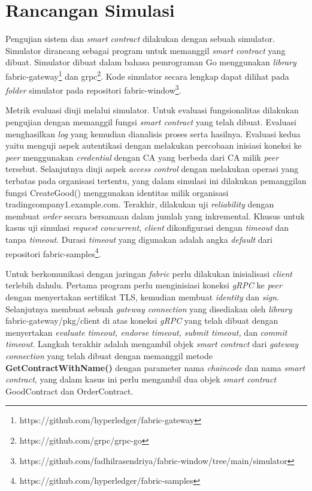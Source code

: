 \section{Rancangan Simulasi}
\label{sec:simulation}
Pengujian sistem dan \textit{smart contract} dilakukan dengan sebuah simulator. Simulator dirancang sebagai program untuk memanggil \textit{smart contract} yang dibuat. Simulator dibuat dalam bahasa pemrograman Go menggunakan \textit{library} fabric-gateway\footnote{https://github.com/hyperledger/fabric-gateway} dan grpc\footnote{https://github.com/grpc/grpc-go}. Kode simulator secara lengkap dapat dilihat pada \textit{folder} simulator pada repositori fabric-window\footnote{https://github.com/fadhilrasendriya/fabric-window/tree/main/simulator}.

Metrik evaluasi diuji melalui simulator. Untuk evaluasi fungsionalitas dilakukan pengujian dengan memanggil fungsi \textit{smart contract} yang telah dibuat. Evaluasi menghasilkan \textit{log} yang kemudian dianalisis proses serta hasilnya. Evaluasi kedua yaitu menguji aspek autentikasi dengan melakukan percobaan inisiasi koneksi ke \textit{peer} menggunakan \textit{credential} dengan CA yang berbeda dari CA milik \textit{peer} tersebut. Selanjutnya diuji aspek \textit{access control} dengan melakukan operasi yang terbatas pada organisasi tertentu, yang dalam simulasi ini dilakukan pemanggilan fungsi CreateGood() menggunakan identitas milik organisasi tradingcompany1.example.com. Terakhir, dilakukan uji \textit{reliability} dengan membuat \textit{order} secara bersamaan dalam jumlah yang inkremental. Khusus untuk kasus uji simulasi \textit{request} \textit{concurrent}, \textit{client} dikonfigurasi dengan \textit{timeout} dan tanpa \textit{timeout}. Durasi \textit{timeout} yang digunakan adalah angka \textit{default} dari repositori fabric-samples\footnote{https://github.com/hyperledger/fabric-samples}.


Untuk berkomunikasi dengan jaringan \textit{fabric} perlu dilakukan inisialisasi \textit{client} terlebih dahulu. Pertama program perlu menginisiasi koneksi \textit{gRPC} ke \textit{peer} dengan menyertakan sertifikat TLS, kemudian membuat \textit{identity} dan \textit{sign}. Selanjutnya membuat sebuah \textit{gateway connection} yang disediakan oleh \textit{library} fabric-gateway/pkg/client di atas koneksi \textit{gRPC} yang telah dibuat dengan menyertakan \textit{evaluate timeout, endorse timeout, submit timeout,} dan \textit{commit timeout}. Langkah terakhir adalah mengambil objek \textit{smart contract} dari \textit{gateway connection} yang telah dibuat dengan memanggil metode \textbf{GetContractWithName()} dengan parameter nama \textit{chaincode} dan nama \textit{smart contract}, yang dalam kasus ini perlu mengambil dua objek \textit{smart contract} GoodContract dan OrderContract. 


